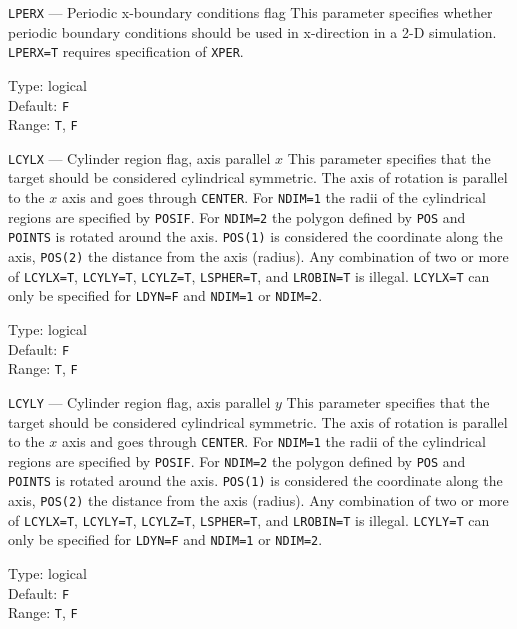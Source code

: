\begin{keydescription}{\texttt{LPERX} --- Periodic x-boundary conditions flag}
%
  This parameter specifies whether periodic boundary conditions should be
  used in x-direction in a 2-D simulation. \texttt{LPERX=T} requires
  specification of \texttt{XPER}.
  \begin{keytab}
    Type:    \> logical \\
    Default: \> \texttt{F} \\
    Range:   \> \texttt{T}, \texttt{F} 
  \end{keytab}
\end{keydescription}

\begin{keydescription}{\texttt{LCYLX} --- Cylinder region flag, axis parallel $x$}
%
  This parameter specifies that the target should be considered cylindrical 
  symmetric. The axis of rotation is parallel to the $x$ axis and goes through 
  \texttt{CENTER}. For \texttt{NDIM=1} the radii of the 
  cylindrical regions are specified by \texttt{POSIF}. For \texttt{NDIM=2}
  the polygon defined by \texttt{POS} and \texttt{POINTS} is rotated around 
  the axis. \texttt{POS(1)} is considered the coordinate along the axis, 
  \texttt{POS(2)} the distance from the axis (radius). Any combination of two
  or more of \texttt{LCYLX=T}, \texttt{LCYLY=T}, \texttt{LCYLZ=T}, 
  \texttt{LSPHER=T}, and \texttt{LROBIN=T} is illegal. \texttt{LCYLX=T} can 
  only be specified for \texttt{LDYN=F} and \texttt{NDIM=1} or \texttt{NDIM=2}. 
  \begin{keytab}
    Type:    \> logical \\
    Default: \> \texttt{F} \\
    Range:   \> \texttt{T}, \texttt{F} 
  \end{keytab}
\end{keydescription}

\begin{keydescription}{\texttt{LCYLY} --- Cylinder region flag, axis parallel $y$}
%
  This parameter specifies that the target should be considered cylindrical 
  symmetric. The axis of rotation is parallel to the $x$ axis and goes through 
  \texttt{CENTER}. For \texttt{NDIM=1} the radii of the 
  cylindrical regions are specified by \texttt{POSIF}. For \texttt{NDIM=2}
  the polygon defined by \texttt{POS} and \texttt{POINTS} is rotated around 
  the axis. \texttt{POS(1)} is considered the coordinate along the axis, 
  \texttt{POS(2)} the distance from the axis (radius). Any combination of two
  or more of \texttt{LCYLX=T}, \texttt{LCYLY=T}, \texttt{LCYLZ=T}, 
  \texttt{LSPHER=T}, and \texttt{LROBIN=T} is illegal. \texttt{LCYLY=T} can 
  only be specified for \texttt{LDYN=F} and \texttt{NDIM=1} or \texttt{NDIM=2}.
  \begin{keytab}
    Type:    \> logical \\
    Default: \> \texttt{F} \\
    Range:   \> \texttt{T}, \texttt{F} 
  \end{keytab}
\end{keydescription}


